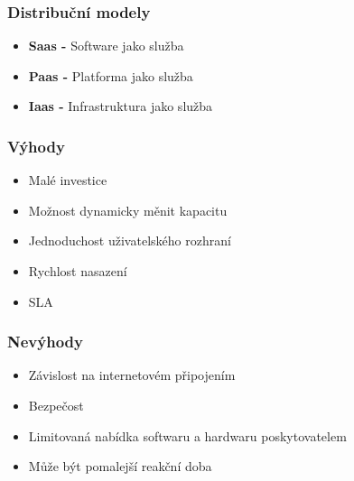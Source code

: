 \documentclass{beamer}
\begin{document}
\begin{frame}
    \frametitle{Distribuční modely}
    \begin{itemize}
	\item \textbf{Saas -} Software jako služba   
	\item \textbf{Paas -} Platforma jako služba 
	\item \textbf{Iaas -} Infrastruktura jako služba
    \end{itemize}
\end{frame}
\begin{frame}
	\frametitle{Výhody}  
	\begin{itemize}
	\item Malé investice
	\item Možnost dynamicky měnit kapacitu
	\item Jednoduchost uživatelského rozhraní
	\item Rychlost nasazení
	\item SLA
	\end{itemize}
\end{frame}
\begin{frame}
	\frametitle{Nevýhody}
	\begin{itemize}
	\item Závislost na internetovém připojením
	\item Bezpečost
	\item Limitovaná nabídka softwaru a hardwaru poskytovatelem
	\item Může být pomalejší reakční doba
	\end{itemize}
\end{frame}
\end{document}

